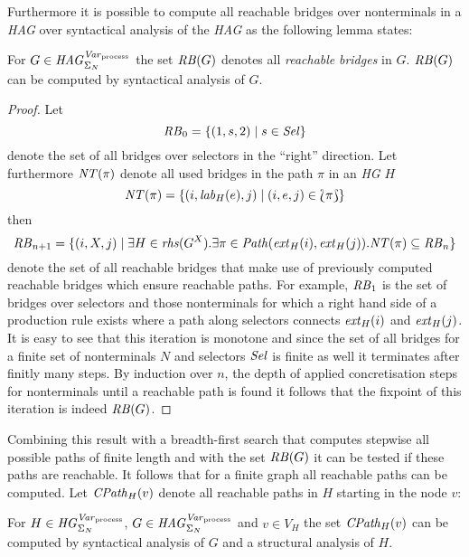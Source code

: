	Furthermore it is possible to compute all reachable bridges over
	nonterminals in a \emph{\ac{HAG}} over syntactical analysis of the
	\emph{\ac{HAG}} as the following lemma states:
	\begin{lemma}
		For $G\in\mathit{HAG}_{\Sigma_{N}}^{\mathit{Var}_{\text{process}}}$ the set $\mathit{RB}(G)$ denotes all \emph{reachable}
		\emph{bridges} in $G$. $\mathit{RB}(G)$ can be computed by syntactical analysis
		of $G$.
	\end{lemma}
	\begin{proof}
		Let
		\begin{equation*}
			\mathit{RB}_{0} =  \{(1,s,2)\mid s\in\mathit{Sel}\}
		\end{equation*}	
		denote the set of all bridges over selectors in the \enquote{right}
		direction.
		Let furthermore $\mathit{NT}(\pi)$ denote all used bridges in the path $\pi$ in
		an \emph{\ac{HG}} $H$
		\begin{equation*}
			\mathit{NT}(\pi)=
				\left\{
					(i,\mathit{lab}_H(e), j)\mid (i,e, j)\in\Lbag\pi\Rbag
				\right\}
		\end{equation*}
		then
		\begin{equation*}
			\mathit{RB}_{n+1} = \{(i,X,j)\mid\exists H\in\mathit{rhs}(G^{X}).
			\exists \pi\in\mathit{Path}(\mathit{ext}_{H}(i),\mathit{ext}_{H}(j)).\mathit{NT}(\pi)
			\subseteq\mathit{RB}_{n}\}
		\end{equation*}
		denote the set of all reachable bridges that make use of
		previously computed reachable bridges which ensure reachable paths. For
		example, $\mathit{RB}_{1}$ is the set of bridges over selectors and those
		nonterminals for which a right hand side of a production rule exists
		where a path along selectors connects $\mathit{ext}_{H}(i)$ and $\mathit{ext}_{H}(j)$.
		It is easy to see that this iteration is monotone and since the set of
		all bridges for a finite set of nonterminals $N$ and selectors $\mathit{Sel}$ is
		finite as well it terminates after finitly many steps. By induction over
		$n$, the depth of applied concretisation steps for nonterminals until a
		reachable path is found it follows that the fixpoint of this iteration
		is indeed $\mathit{RB}(G)$.
	\end{proof}
	Combining this result with a breadth-first search that computes stepwise all
	possible paths of finite length and with the set $\mathit{RB}(G)$ it can be tested
	if these paths are reachable. It follows that for a finite graph all
	reachable paths can be computed. Let $\mathit{CPath}_{H}(v)$ denote all reachable
	paths in $H$ starting in the node $v$:
	\begin{corollary}
		For $H\in\mathit{HG}_{\Sigma_{N}}^{\mathit{Var}_{\text{process}}}$, $G\in\mathit{HAG}_{\Sigma_{N}}^{\mathit{Var}_{\text{process}}}$ and $v\in V_{H}$ the set $\mathit{CPath}_{H}(v)$ can
		be computed by syntactical analysis of $G$ and a structural analysis of
		$H$.
	\end{corollary}
